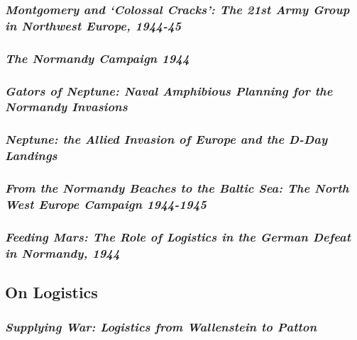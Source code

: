 \documentclass[noraggedright]{turabian-researchpaper}
\begin{document}
			
		\subsubsection{\textit{Montgomery and `Colossal Cracks':  
			The 21st Army Group in Northwest Europe, 1944-45}}
		\subsubsection{\textit{The Normandy Campaign 1944}}
		\subsubsection{\textit{Gators of Neptune: Naval Amphibious
			Planning for the Normandy Invasions}}
		\subsubsection{\textit{Neptune:  the Allied Invasion of 
			Europe and the D-Day Landings}}
		\subsubsection{\textit{From the Normandy Beaches to the 
			Baltic Sea: The North West Europe Campaign
			1944-1945}}
		\subsubsection{\textit{Feeding Mars:  The Role of Logistics
			in the German Defeat in Normandy, 1944}}

	\subsection{On Logistics}


		\subsubsection{\textit{Supplying War:  Logistics from
			Wallenstein to Patton}}
\end{document}
